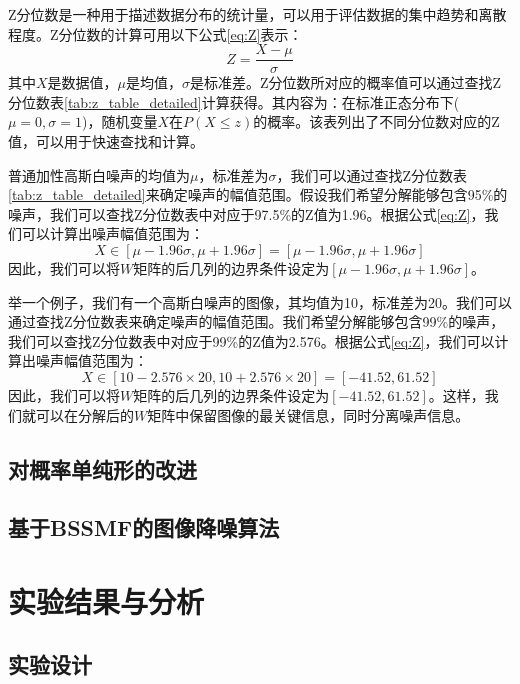 \documentclass[12pt]{article}
\begin{document}
Z分位数是一种用于描述数据分布的统计量，可以用于评估数据的集中趋势和离散程度。Z分位数的计算可用以下公式\ref{eq:Z}表示：
\begin{equation}
    Z = \frac{X - \mu}{\sigma}
    \label{eq:Z}
\end{equation}
其中$X$是数据值，$\mu$是均值，$\sigma$是标准差。Z分位数所对应的概率值可以通过查找Z分位数表\ref{tab:z_table_detailed}计算获得。其内容为：在标准正态分布下($\mu = 0 , \sigma = 1 $)，随机变量$X$在$P(X \leq z)$的概率。该表列出了不同分位数对应的Z值，可以用于快速查找和计算。

普通加性高斯白噪声的均值为$\mu$，标准差为$\sigma$，我们可以通过查找Z分位数表\ref{tab:z_table_detailed}来确定噪声的幅值范围。假设我们希望分解能够包含95\%的噪声，我们可以查找Z分位数表中对应于97.5\%的Z值为1.96。根据公式\ref{eq:Z}，我们可以计算出噪声幅值范围为：
\begin{equation}
    X \in [\mu - 1.96\sigma, \mu + 1.96\sigma] = [\mu -1.96\sigma,\mu + 1.96\sigma]
\end{equation}
因此，我们可以将$W$矩阵的后几列的边界条件设定为$[\mu -1.96\sigma,\mu + 1.96\sigma]$。

举一个例子，我们有一个高斯白噪声的图像，其均值为10，标准差为20。我们可以通过查找Z分位数表来确定噪声的幅值范围。我们希望分解能够包含99\%的噪声，我们可以查找Z分位数表中对应于99\%的Z值为2.576。根据公式\ref{eq:Z}，我们可以计算出噪声幅值范围为：
\begin{equation}
    X \in [10 - 2.576 \times 20, 10 + 2.576 \times 20] = [-41.52, 61.52]
\end{equation}
因此，我们可以将$W$矩阵的后几列的边界条件设定为$[-41.52, 61.52]$。这样，我们就可以在分解后的$W$矩阵中保留图像的最关键信息，同时分离噪声信息。

\subsection{对概率单纯形的改进}


\subsection{基于BSSMF的图像降噪算法}

\newpage
\section{实验结果与分析}
\subsection{实验设计}
\end{document}
